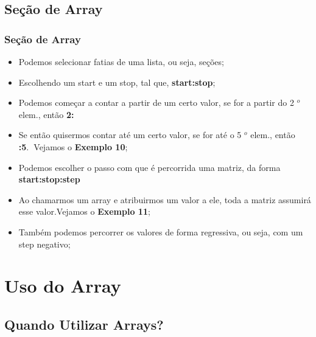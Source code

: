 \documentclass[notes=show]{beamer}
\begin{document}
\subsection{Se\c{c}\~{a}o de Array}

\begin{frame}%

\frametitle{Se\c{c}\~{a}o de Array}

\begin{itemize}
\item Podemos selecionar fatias de uma lista, ou seja, se\c{c}\~{o}es;

\item Escolhendo um start e um stop, tal que, \textbf{start:stop};

\item Podemos come\c{c}ar a contar a partir de um certo valor, se for a
partir do 2%
${{}^o}$
elem., ent\~{a}o \textbf{2:}

\item Se ent\~{a}o quisermos contar at\'{e} um certo valor, se for at\'{e} o
5%
${{}^o}$
elem., ent\~{a}o \textbf{:5}.\textbf{\ }Vejamos o \textbf{Exemplo 10};

\item Podemos escolher o passo com que \'{e} percorrida uma matriz, da forma 
\textbf{start:stop:step}

\item Ao chamarmos um array e atribuirmos um valor a ele, toda a matriz
assumir\'{a} esse valor.Vejamos o \textbf{Exemplo 11};

\item Tamb\'{e}m podemos percorrer os valores de forma regressiva, ou seja,
com um step negativo;
\end{itemize}

\transboxout%
\end{frame}%

\section{Uso do Array}

\subsection{Quando Utilizar Arrays?}
\end{document}
